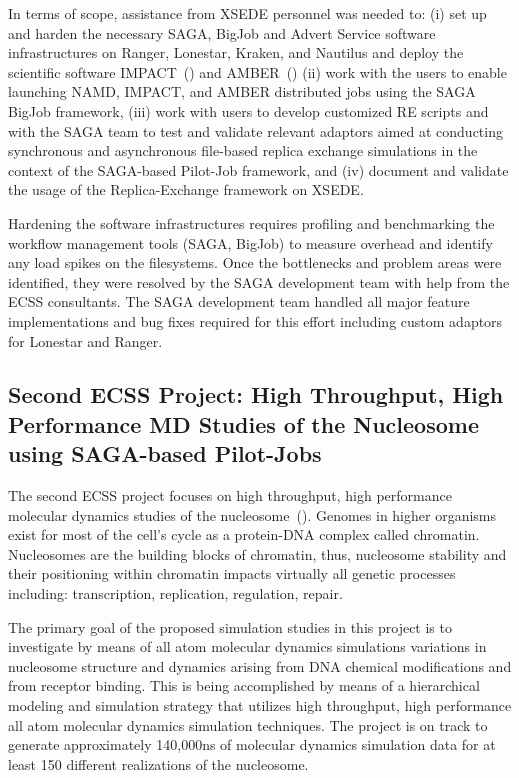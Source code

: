 \documentclass{sig-alternate}
\begin{document}
In terms of scope, assistance from XSEDE personnel was needed to: (i) set up and
harden the necessary SAGA, BigJob and Advert Service software infrastructures on
Ranger, Lonestar, Kraken, and Nautilus and deploy the scientific software
IMPACT~(\cite{IMPACT}) and AMBER~(\cite{AMBER}) (ii) work with the
users to enable launching NAMD, IMPACT, and AMBER distributed jobs using the
SAGA BigJob framework, (iii) work with users to develop customized RE scripts
and with the SAGA team to test and validate relevant adaptors aimed at
conducting synchronous and asynchronous ﬁle-based replica exchange simulations
in the context of the SAGA-based Pilot-Job framework, and (iv)  document and
validate the usage of the Replica-Exchange framework on XSEDE.

Hardening the software infrastructures requires profiling and benchmarking the
workflow management tools (SAGA, BigJob) to measure overhead and identify any
load spikes on the filesystems. Once the bottlenecks and problem areas were
identified, they were resolved by the SAGA development team with help from
the ECSS consultants. The SAGA development team handled all major feature
implementations and bug fixes required for this effort including custom
adaptors for Lonestar and Ranger. 

\subsection{Second ECSS Project: High Throughput, High Performance MD Studies of the Nucleosome
using SAGA-based Pilot-Jobs}
The second ECSS project focuses on high throughput, high performance molecular
dynamics studies of the nucleosome~(\cite{TomBishop}). Genomes in higher
organisms
exist for most of the cell's cycle as a protein-DNA complex called chromatin.
Nucleosomes are the building blocks of chromatin, thus, nucleosome stability and
their positioning within chromatin impacts virtually all genetic processes
including: transcription, replication, regulation, repair.

The primary goal of the proposed simulation studies in this project is to
investigate by means of all atom molecular dynamics simulations variations in
nucleosome structure and dynamics arising from DNA chemical modifications and
from receptor binding. This is being accomplished by means of a hierarchical
modeling and simulation strategy that utilizes high throughput, high
performance all atom molecular dynamics simulation techniques. The project is
on track to generate approximately 140,000ns of molecular dynamics simulation
data for at least 150 different realizations of the nucleosome.
\end{document}
